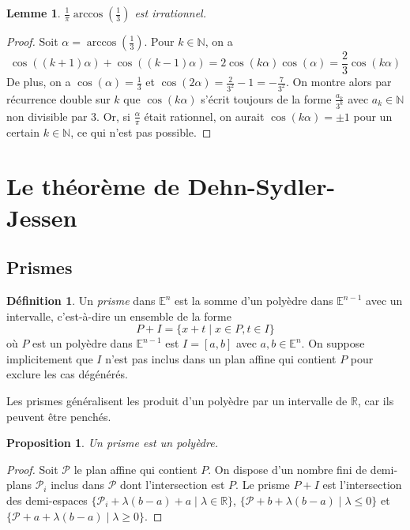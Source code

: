 \documentclass{article}
\newcommand{\N}{\mathbb{N}}
\newcommand{\R}{\mathbb{R}}
\newcommand{\E}{\mathbb{E}}
\renewcommand{\P}{\mathcal{P}}
\theoremstyle{plain}
\newtheorem{proposition}[theorem]{Proposition}
\newtheorem{lemma}[theorem]{Lemme}
\theoremstyle{definition}
\newtheorem{definition}[theorem]{Définition}
\theoremstyle{remark}
\begin{document}
\begin{lemma}
    $\frac{1}{\pi}\arccos \left( \frac{1}{3} \right)$ est irrationnel.
\end{lemma}

\begin{proof}
    Soit $\alpha = \arccos \left( \frac{1}{3} \right)$. Pour $k\in \N$, on a
    \[\cos((k+1)\alpha) + \cos((k-1)\alpha) = 2 \cos(k\alpha)\cos(\alpha) = \frac{2}{3} \cos(k \alpha)\]
    De plus, on a $\cos(\alpha) = \frac{1}{3}$ et $\cos(2\alpha) = \frac{2}{3^2} - 1 = - \frac{7}{3^2}$. On montre alors par récurrence double sur $k$ que $\cos(k\alpha)$ s'écrit toujours de la forme $\frac{a_k}{3^k}$ avec $a_k \in \N$ non divisible par $3$. Or, si $\frac{\alpha}{\pi}$ était rationnel, on aurait $\cos(k\alpha) = \pm 1$ pour un certain $k \in \N$, ce qui n'est pas possible.
\end{proof}

\section{Le théorème de Dehn-Sydler-Jessen}

\subsection{Prismes}

\begin{definition}
    Un \emph{prisme} dans $\E^n$ est la somme d'un polyèdre dans $\E^{n-1}$ avec un intervalle, c'est-à-dire un ensemble de la forme
    \[P + I = \{x + t \mid x \in P, t \in I\}\]
    où $P$ est un polyèdre dans $\E^{n-1}$ est $I = [a,b]$ avec $a,b \in \E^n$. On suppose implicitement que $I$ n'est pas inclus dans un plan affine qui contient $P$ pour exclure les cas dégénérés. 
\end{definition}

Les prismes généralisent les produit d'un polyèdre par un intervalle de $\R$, car ils peuvent être penchés.

\begin{proposition}
    Un prisme est un polyèdre.
\end{proposition}

\begin{proof}
    Soit $\P$ le plan affine qui contient $P$. On dispose d'un nombre fini de demi-plans $\P_i$ inclus dans $\P$ dont l'intersection est $P$. Le prisme $P+I$ est l'intersection des demi-espaces $\{\P_i + \lambda (b-a) + a \mid \lambda \in \R\}$, $\{\P + b + \lambda (b-a) \mid \lambda \le 0 \}$ et $\{\P + a + \lambda (b-a) \mid \lambda \ge 0 \}$.
\end{proof}
\end{document}
